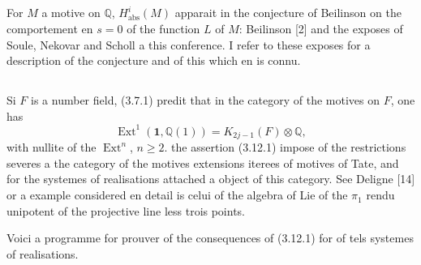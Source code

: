 \documentclass[11pt,a4paper]{article}
\theoremstyle{plain}
\theoremstyle{definition}
\DeclareMathOperator{\Ext}{Ext}
\newcommand{\Q}{\mathbb{Q}}
\newcommand{\abs}{\mathrm{abs}}
\begin{document}
\subsection{}

For $M$ a motive on $\Q$, $H^i_{\abs}(M)$ apparait in the conjecture of Beilinson on the comportement en $s = 0$ of the function $L$ of $M$: Beilinson [2] and the exposes of Soule, Nekovar and Scholl a this conference. I refer to these exposes for a description of the conjecture and of this which en is connu.

\subsection{}

Si $F$ is a number field, (3.7.1) predit that in the category of the motives on $F$, one has
\begin{equation}
\tag{3.12.1}
\Ext^1(\mathbf{1}, \Q(1)) = K_{2j-1}(F) \otimes \Q,
\end{equation}
with nullite of the $\Ext^n$, $n \geq 2$. the assertion (3.12.1) impose of the restrictions severes a the category of the motives extensions iterees of motives of Tate, and for the systemes of realisations attached a object of this category. See Deligne [14] or a example considered en detail is celui of the algebra of Lie of the $\pi_1$ rendu unipotent of the projective line less trois points.

Voici a programme for prouver of the consequences of (3.12.1) for of tels systemes of realisations.
\end{document}
